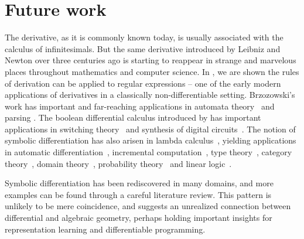 \documentclass[12pt,initial,twoside,maitrise]{dms}
\numberwithin{equation}{section}
\numberwithin{table}{chapter}
\numberwithin{figure}{chapter}
\begin{document}
\section{Future work}\label{sec:future-work}


The derivative, as it is commonly known today, is usually associated with the calculus of infinitesimals. But the same derivative introduced by Leibniz and Newton over three centuries ago is starting to reappear in strange and marvelous places throughout mathematics and computer science. In \citet{brzozowski1964derivatives}, we are shown the rules of derivation can be applied to regular expressions -- one of the early modern applications of derivatives in a classically non-differentiable setting. Brzozowski's work has important and far-reaching applications in automata theory~\citep{berry1986regex, antimirov1996partial, champarnaud1999regular} and parsing \citep{might2011parsing, moss2014derivatives}. The boolean differential calculus introduced by \citet{thayse1981boolean} has important applications in switching theory~\citep{thayse1973boolean} and synthesis of digital circuits~\citep{steinbach2017boolean}. The notion of symbolic differentiation has also arisen in lambda calculus~\citep{ehrhard2003differential}, yielding applications in automatic differentiation~\citep{kelly2016evolving}, incremental computation~\citep{cai2014theory, alvarezpicallo2019fixing}, type theory~\citep{mcbride2001derivative, mcbride2008clowns, chen2012type}, category theory~\citep{blute2006differential, blute2009cartesian}, domain theory~\citep{edalat2002domain}, probability theory~\citep{kac1951probability} and linear logic~\citep{ehrhard2018introduction, clift2018derivatives}.

Symbolic differentiation has been rediscovered in many domains, and more examples can be found through a careful literature review. This pattern is unlikely to be mere coincidence, and suggests an unrealized connection between differential and algebraic geometry, perhaps holding important insights for representation learning and differentiable programming.
\end{document}
